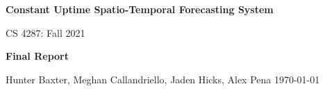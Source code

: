 \begin{titlepage}
    \begin{center}
        \vspace*{1cm}
        
        \Huge
          \textbf{Constant Uptime Spatio-Temporal Forecasting System} %
        
        \vspace{0.5cm}
        \LARGE
        CS 4287: Fall 2021
        
        \vspace{1.5cm}
        
        \textbf{}
   		  \vspace{1.5cm}
        
        \textbf{Final Report}
       
        \vfill
        
        
        \vspace{0.8cm}
          \Large
        Hunter Baxter, Meghan Callandriello, Jaden Hicks, Alex Pena
        \vspace{0.5cm}
       \today
        
    \end{center}
\end{titlepage}